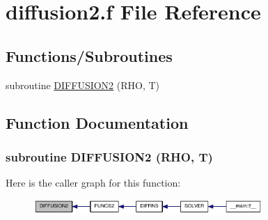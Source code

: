 \hypertarget{diffusion2_8f}{
\section{diffusion2.f File Reference}
\label{diffusion2_8f}
}
\subsection*{Functions/Subroutines}
\begin{DoxyCompactItemize}
\item 
subroutine \hyperlink{diffusion2_8f_aee09eb9238fcf6b563d21a650f3f390f}{DIFFUSION2} (RHO, T)
\end{DoxyCompactItemize}


\subsection{Function Documentation}
\hypertarget{diffusion2_8f_aee09eb9238fcf6b563d21a650f3f390f}{
\subsubsection[{DIFFUSION2}]{\setlength{\rightskip}{0pt plus 5cm}subroutine DIFFUSION2 (RHO, \/  T)}}
\label{diffusion2_8f_aee09eb9238fcf6b563d21a650f3f390f}


Here is the caller graph for this function:\nopagebreak
\begin{figure}[H]
\begin{center}
\leavevmode
\includegraphics[width=247pt]{diffusion2_8f_aee09eb9238fcf6b563d21a650f3f390f_icgraph}
\end{center}
\end{figure}
